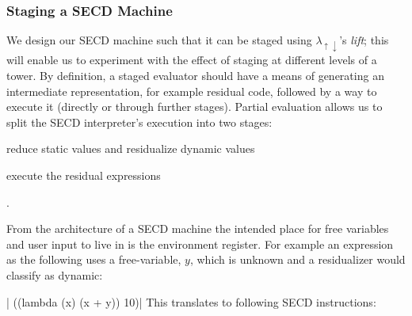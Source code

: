 \documentclass[a4paper,12pt,twoside,openright]{report}
\theoremstyle{definition}
\newcommand{\mslang}{$\lambda_{\uparrow\downarrow}$}
\begin{document}
\subsubsection{Staging a SECD Machine}\label{subsec:secd_staged}

We design our SECD machine such that it can be staged using \mslang's \textit{lift}; this will enable us to experiment with the effect of staging at different levels of a tower. By definition, a staged evaluator should have a means of generating an intermediate representation, for example residual code, followed by a way to execute it (directly or through further stages). Partial evaluation allows us to split the SECD interpreter's execution into two stages:
\begin{enumerate*}[label=(\arabic*)]
    \item reduce static values and residualize dynamic values
    \item execute the residual expressions
\end{enumerate*}.

From the architecture of a SECD machine the intended place for free variables and user input to live in is the environment register. For example an expression as the following uses a free-variable, $y$, which is unknown and a residualizer would classify as dynamic:

|    ((lambda (x) (x + y)) 10)|
This translates to following SECD instructions:
\end{document}
